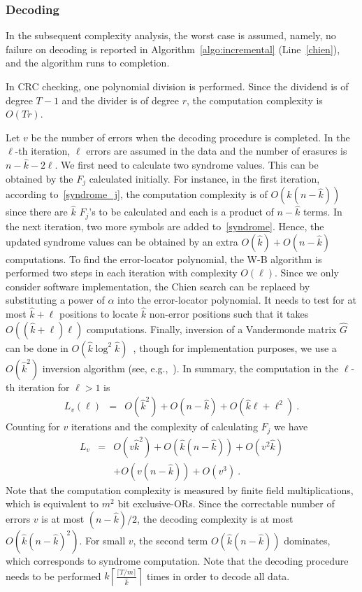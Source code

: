 \documentclass[10pt,journal,letterpaper,compsoc]{IEEEtran}
\newcommand{\0}{{\bf 0}}
\newcounter{step}
\begin{document}
\subsubsection{Decoding}
\label{sect:decoding_complexity}
In the subsequent complexity analysis, the worst case is assumed, namely, no
failure on decoding is reported in Algorithm~\ref{algo:incremental}
(Line~\ref{chien}), and the algorithm runs to completion.

In CRC checking, one polynomial division is performed. Since the dividend is of
degree $T-1$ and the divider is of degree $r$, the computation complexity is $O(Tr)$.

Let $v$ be the number of errors when the decoding procedure is completed.
In the $\ell$-th iteration, $\ell$ errors are assumed in the data and the
number of erasures is $n-\hat{k}-2\ell$. We first need to calculate two
syndrome values. This can be obtained by the $F_j$ calculated initially. For instance, in the first iteration, according to~\eqref{syndrome_j}, the
computation complexity is of $O(\hat{k}(n-\hat{k}))$ since there are $\hat{k}$ $F_j$'s to be calculated and each is a product of $n-\hat{k}$ terms. In the next iteration, two more symbols are
added to~\eqref{syndrome}. Hence, the updated syndrome values can be obtained by an extra
$O(\hat{k})+O(n-\hat{k})$ computations. To find the error-locator polynomial, the W-B
algorithm is performed two steps in each iteration with complexity $O(\ell)$.
Since we only consider software implementation,  the Chien search can be
replaced by substituting a power of $\alpha$ into the error-locator polynomial.
It needs to test for at most $\hat{k}+\ell$ positions to locate $\hat{k}$ non-error
positions such that it takes $O((\hat{k}+\ell)\ell)$ computations. Finally, inversion
of a Vandermonde matrix $\hat{G}$ can be done in $O(\hat{k}\log^2\hat{k})$~\cite{GOH94}, though for implementation purposes,
we use a $O(\hat{k}^2)$ inversion algorithm (see, e.g.,~\cite{william1988numerical}).
In
summary, the computation in the $\ell$-th iteration for $\ell>1$ is
\begin{eqnarray*}
L_v(\ell)&=&
O(\hat{k}^2)+O(n-\hat{k})+O(\hat{k}\ell+\ell^2)~.
\end{eqnarray*}
Counting for $v$ iterations and the complexity of calculating $F_j$ we have
\begin{eqnarray}
L_v&=&O(v\hat{k}^2)+O(\hat{k}(n-\hat{k}))+O(v^2\hat{k})\nonumber\\
&&+O(v(n-\hat{k}))+O(v^3)~.\label{eq:dec_comp}
\end{eqnarray}
Note that the computation complexity is measured by finite field multiplications,
which is  equivalent to $m^2$ bit exclusive-ORs.  Since the correctable number
of errors $v$ is at most $(n-\hat{k})/2$, the decoding complexity is at most
$O(\hat{k}(n-\hat{k})^2)$. For small $v$, 
the second term $O(\hat{k}(n-\hat{k}))$ dominates, which corresponds to syndrome computation. 
Note that the decoding procedure needs to be performed $k\left\lceil\frac{\lceil
T/m\rceil}{\hat{k}}\right\rceil$ times in order to decode all data.
\end{document}
